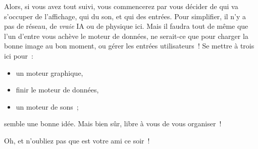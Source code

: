 Alors, si vous avez tout suivi, vous commencerez par vous décider de qui va s'occuper de l'affichage, qui du son, et qui des entrées. Pour simplifier, il n'y a pas de réseau, de \emph{vraie} IA ou de physique ici. Mais il faudra tout de même que l'un d'entre vous achève le moteur de données, ne serait-ce que pour charger la bonne image au bon moment, ou gérer les entrées utilisateurs~! Se mettre à trois ici pour~:

\begin{itemize}
   \item un moteur graphique,
   \item finir le moteur de données,
   \item un moteur de sons~;
\end{itemize}

semble une bonne idée. Mais bien sûr, libre à vous de vous organiser~!

Oh, et n’oubliez pas que \svn est votre ami ce soir~!